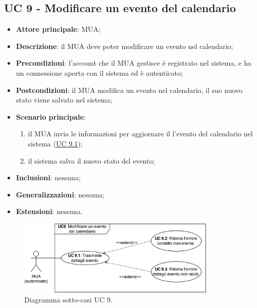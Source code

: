 \subsection{UC 9 - Modificare un evento del calendario} \label{sec:UC9}
    \begin{itemize}
        \item \textbf{Attore principale}: MUA;
        \item \textbf{Descrizione}: il MUA deve poter modificare un evento nel calendario;
        \item \textbf{Precondizioni}: l’account che il MUA gestisce è registrato nel sistema, e ha un connessione aperta con il sistema ed è autenticato;
        \item \textbf{Postcondizioni}: il MUA modifica un evento nel calendario, il suo nuovo stato viene salvato nel sistema;
        \item \textbf{Scenario principale}:
            \begin{enumerate}
                \item il MUA invia le informazioni per aggiornare il l'evento del calendario nel sistema (\hyperref[sec:UC9.1]{UC 9.1});
                \item il sistema salva il nuovo stato del evento;
            \end{enumerate}
        \item \textbf{Inclusioni}: nessuna;
        \item \textbf{Generalizzazioni}: nessuna;
        \item \textbf{Estensioni}: nessuna.
    \end{itemize}

\begin{figure}[h]
    \includegraphics[width=0.85\textwidth]{sections/uc_imgs/UC09.X.png}
    \centering
    \caption{Diagramma sotto-casi UC 9.}
\end{figure}

